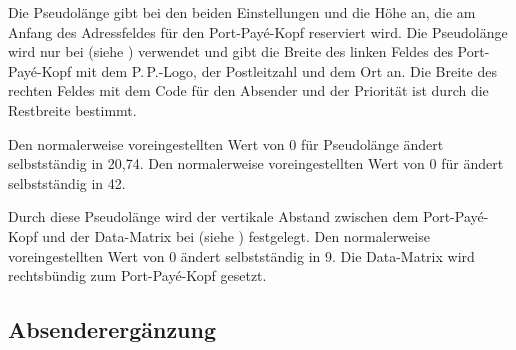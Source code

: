 \begin{Declaration}
\end{Declaration}
Die Pseudolänge  gibt bei den beiden
Einstellungen
%
 und
%
 die Höhe an, die am
Anfang des Adressfeldes für den Port-Payé-Kopf reserviert wird. Die
Pseudolänge  wird nur bei
 (siehe
) verwendet und gibt die Breite des
linken Feldes des Port-Payé-Kopf mit dem P.\,P.-Logo, der Postleitzahl und dem
Ort an. Die Breite des rechten Feldes mit dem Code für den Absender und der
Priorität ist durch die Restbreite bestimmt.

Den normalerweise voreingestellten Wert von
0 für Pseudolänge  ändert \KOMAScript{}
selbstständig in 20,74. Den normalerweise voreingestellten Wert von
0 für  ändert \KOMAScript{} selbstständig in
42.%
%
\EndIndexGroup


\begin{Declaration}
\end{Declaration}
Durch diese Pseudolänge wird der vertikale
Abstand zwischen dem Port-Payé-Kopf und der Data-Matrix bei
%
%
 (siehe
)
festgelegt. Den normalerweise
voreingestellten Wert von 0 ändert \KOMAScript{} selbstständig in
9. Die Data-Matrix wird rechtsbündig zum Port-Payé-Kopf gesetzt.%
\EndIndexGroup
%
\EndIndexGroup


\subsection{Absenderergänzung}
\BeginIndexGroup
{}%

